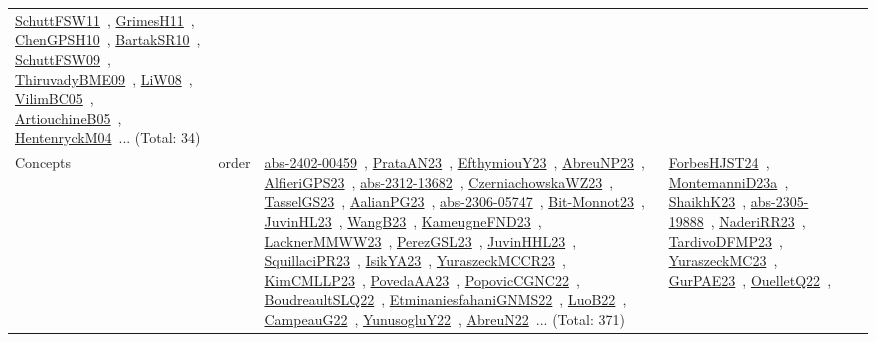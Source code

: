 {\begin{longtable}{lp{3cm}>{\raggedright\arraybackslash}p{6cm}>{\raggedright\arraybackslash}p{6cm}>{\raggedright\arraybackslash}p{8cm}}
\href{works/SchuttFSW11.pdf}{SchuttFSW11}~\cite{SchuttFSW11}, \href{works/GrimesH11.pdf}{GrimesH11}~\cite{GrimesH11}, \href{works/ChenGPSH10.pdf}{ChenGPSH10}~\cite{ChenGPSH10}, \href{works/BartakSR10.pdf}{BartakSR10}~\cite{BartakSR10}, \href{works/SchuttFSW09.pdf}{SchuttFSW09}~\cite{SchuttFSW09}, \href{works/ThiruvadyBME09.pdf}{ThiruvadyBME09}~\cite{ThiruvadyBME09}, \href{works/LiW08.pdf}{LiW08}~\cite{LiW08}, \href{works/VilimBC05.pdf}{VilimBC05}~\cite{VilimBC05}, \href{works/ArtiouchineB05.pdf}{ArtiouchineB05}~\cite{ArtiouchineB05}, \href{works/HentenryckM04.pdf}{HentenryckM04}~\cite{HentenryckM04}... (Total: 34)\\
Concepts & order & \href{works/abs-2402-00459.pdf}{abs-2402-00459}~\cite{abs-2402-00459}, \href{works/PrataAN23.pdf}{PrataAN23}~\cite{PrataAN23}, \href{works/EfthymiouY23.pdf}{EfthymiouY23}~\cite{EfthymiouY23}, \href{works/AbreuNP23.pdf}{AbreuNP23}~\cite{AbreuNP23}, \href{works/AlfieriGPS23.pdf}{AlfieriGPS23}~\cite{AlfieriGPS23}, \href{works/abs-2312-13682.pdf}{abs-2312-13682}~\cite{abs-2312-13682}, \href{works/CzerniachowskaWZ23.pdf}{CzerniachowskaWZ23}~\cite{CzerniachowskaWZ23}, \href{works/TasselGS23.pdf}{TasselGS23}~\cite{TasselGS23}, \href{works/AalianPG23.pdf}{AalianPG23}~\cite{AalianPG23}, \href{works/abs-2306-05747.pdf}{abs-2306-05747}~\cite{abs-2306-05747}, \href{works/Bit-Monnot23.pdf}{Bit-Monnot23}~\cite{Bit-Monnot23}, \href{works/JuvinHL23.pdf}{JuvinHL23}~\cite{JuvinHL23}, \href{works/WangB23.pdf}{WangB23}~\cite{WangB23}, \href{works/KameugneFND23.pdf}{KameugneFND23}~\cite{KameugneFND23}, \href{works/LacknerMMWW23.pdf}{LacknerMMWW23}~\cite{LacknerMMWW23}, \href{works/PerezGSL23.pdf}{PerezGSL23}~\cite{PerezGSL23}, \href{works/JuvinHHL23.pdf}{JuvinHHL23}~\cite{JuvinHHL23}, \href{works/SquillaciPR23.pdf}{SquillaciPR23}~\cite{SquillaciPR23}, \href{works/IsikYA23.pdf}{IsikYA23}~\cite{IsikYA23}, \href{works/YuraszeckMCCR23.pdf}{YuraszeckMCCR23}~\cite{YuraszeckMCCR23}, \href{works/KimCMLLP23.pdf}{KimCMLLP23}~\cite{KimCMLLP23}, \href{works/PovedaAA23.pdf}{PovedaAA23}~\cite{PovedaAA23}, \href{works/PopovicCGNC22.pdf}{PopovicCGNC22}~\cite{PopovicCGNC22}, \href{works/BoudreaultSLQ22.pdf}{BoudreaultSLQ22}~\cite{BoudreaultSLQ22}, \href{works/EtminaniesfahaniGNMS22.pdf}{EtminaniesfahaniGNMS22}~\cite{EtminaniesfahaniGNMS22}, \href{works/LuoB22.pdf}{LuoB22}~\cite{LuoB22}, \href{works/CampeauG22.pdf}{CampeauG22}~\cite{CampeauG22}, \href{works/YunusogluY22.pdf}{YunusogluY22}~\cite{YunusogluY22}, \href{works/AbreuN22.pdf}{AbreuN22}~\cite{AbreuN22}... (Total: 371) & \href{works/ForbesHJST24.pdf}{ForbesHJST24}~\cite{ForbesHJST24}, \href{works/MontemanniD23a.pdf}{MontemanniD23a}~\cite{MontemanniD23a}, \href{works/ShaikhK23.pdf}{ShaikhK23}~\cite{ShaikhK23}, \href{works/abs-2305-19888.pdf}{abs-2305-19888}~\cite{abs-2305-19888}, \href{works/NaderiRR23.pdf}{NaderiRR23}~\cite{NaderiRR23}, \href{works/TardivoDFMP23.pdf}{TardivoDFMP23}~\cite{TardivoDFMP23}, \href{works/YuraszeckMC23.pdf}{YuraszeckMC23}~\cite{YuraszeckMC23}, \href{works/GurPAE23.pdf}{GurPAE23}~\cite{GurPAE23}, \href{works/OuelletQ22.pdf}{OuelletQ22}~\cite{OuelletQ22}, 
\end{longtable}}
